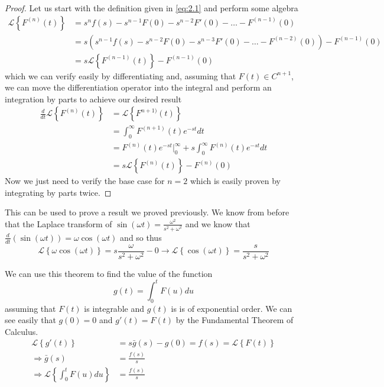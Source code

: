 \documentclass{report}
\theoremstyle{definition}
\theoremstyle{remark}
\newcommand{\lapt}[1]{\mathscr{L}\left\{ #1\right\}}
\newcommand{\od}[2]{\frac{d #1}{d#2}}
\begin{document}
\begin{proof}
          Let us start with the definition given in \eqref{eq:2.1} and perform some algebra
          \begin{equation*}
              \begin{split}
                  \lapt{F^{(n)}(t)} &= s^nf(s) -s^{n-1}F(0)-s^{n-2}F'(0) -\ldots-F^{(n-1)}(0) \\
                  & =s\left( s^{n-1}f(s) -s^{n-2}F(0)-s^{n-3}F'(0) -\ldots-F^{(n-2)}(0) \right) -F^{(n-1)}(0) \\
                  &=s\lapt{F^{(n-1)}(t)} -F^{(n-1)}(0)
              \end{split}
          \end{equation*}
          which we can verify easily by differentiating and, assuming that $F(t) \in C^{n+1}$, we can move the differentiation operator into the integral and perform an integration by parts to achieve our desired result 
          \begin{equation*}
              \begin{split}
                  \od{}{t}\lapt{F^{(n)}(t)} & = \lapt{F^{n+1)}(t)} \\
                  &= \int^\infty_0 F^{(n+1)}(t)e^{-st}dt \\
                  &= F^{(n)}(t)e^{-st} \Big|^\infty_0 + s\int^\infty_0F^{(n)}(t)e^{-st}dt\\
                  &=s\lapt{F^{(n)}(t)} -F^{(n)}(0)
              \end{split}
          \end{equation*}
          Now we just need to verify the base case for $n=2$ which is easily proven by integrating by parts twice.
\end{proof}
This can be used to prove a result we proved previously. We know from before that the Laplace transform of $\sin(\omega t)=\frac{\omega^2}{s^2+\omega^2}$ and we know that $\od{}{t}(\sin (\omega t)) = \omega \cos (\omega t)$ and so thus 
\begin{equation*}
    \lapt{\omega \cos (\omega t)} = s \frac{\omega}{s^2+\omega^2} - 0 \rightarrow \lapt{\cos (\omega t)} = \frac{s}{s^2+\omega^2}
\end{equation*}


We can use this theorem to find the value of the function 
\begin{equation*}
    g(t) = \int^t_0 F(u)du
\end{equation*}
assuming that $F(t)$ is integrable and $g(t)$ is is of exponential order. We can see easily that $g(0)=0$ and $g'(t) = F(t)$ by the Fundamental Theorem of Calculus. 
\begin{equation*}
    \begin{split}
        \lapt{g'(t)} &= s\bar{g}(s) - g(0) = f(s) = \lapt{F(t)} \\
        \Rightarrow  \bar{g}(s) &= \frac{f(s)}{s} \\
        \Rightarrow \lapt{\int^t_0F(u)du} &=\frac{f(s)}{s}
    \end{split}
\end{equation*}
\end{document}
